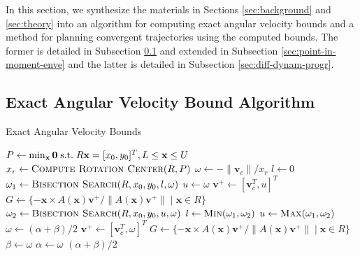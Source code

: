 \documentclass[conference]{IEEEtran}
\makeatletter
\def\BState{\State\hskip-\ALG@thistlm}
\makeatother
\begin{document}
In this section, we synthesize the materials in Sections
\ref{sec:background} and \ref{sec:theory} into an algorithm for
computing exact angular velocity bounds and a method for planning
convergent trajectories using the computed bounds. The former is
detailed in Subsection \ref{sec:exact-ang-vel-bound-alg} and extended
in Subsection \ref{sec:point-in-moment-enve} and the latter is
detailed in Subsection \ref{sec:diff-dynam-progr}.



\subsection{Exact Angular Velocity Bound
  Algorithm}\label{sec:exact-ang-vel-bound-alg}

\begin{algorithm}[t]
\caption{Exact Angular Velocity Bounds}\label{alg:angular-velocity-bounds}
\begin{algorithmic}[1]
 \Return {$[0,0]$}
\EndIf
\State $P \gets \min_\mathbf{x} \mathbf{0} \text{\;s.t.\;} R\mathbf{x} = [x_0,y_0]^T,  L \leq \mathbf{x} \leq U$ \label{line:find-pressure}
\State $x_r \gets \Call{Compute Rotation Center}{R,P}$ \label{line:find-rc}
\State $\omega \gets -\lVert\mathbf{v}_c\rVert/x_r$ \label{line:rc-to-w}
\State $l \gets 0$ \label{line:0}
\State $\omega_1 \gets \Call{Bisection Search}{R,x_0,y_0,l,\omega}$ \label{line:bisection-1}
\State $u \gets \omega$ \label{line:find-u-start}
\Do%
\State $\mathbf{v}^+ \gets [\mathbf{v}_c^T, u]^T$
\State $G \gets \{-\mathbf{x}\times A(\mathbf{x})\mathbf{v}^+ / \lVert A(\mathbf{x})\mathbf{v}^+ \rVert \;|\; \mathbf{x} \in R\}$
 \label{line:find-u-end}
\State $\omega_2 \gets \Call{Bisection Search}{R,x_0,y_0,u,\omega}$ \label{line:bisection-2}
\State $l \gets \Call{Min}{\omega_1,\omega_2}$
\State $u \gets \Call{Max}{\omega_1,\omega_2}$
\State \Return {$[l, u]$}
\EndFunction
% 
\While{$\varepsilon < |\alpha-\beta|$}
\State $\omega \gets (\alpha + \beta)/2$
\State $\mathbf{v}^+ \gets [\mathbf{v}_c^T, \omega]^T$
\State $G \gets \{-\mathbf{x}\times A(\mathbf{x})\mathbf{v}^+ / \lVert A(\mathbf{x})\mathbf{v}^+ \rVert \;|\; \mathbf{x} \in R\}$
\State $\beta \gets \omega$
\Else{} 
\State $\alpha \gets \omega$
\EndIf
\EndWhile
\State \Return $(\alpha + \beta)/2$
\EndFunction
\end{algorithmic}
\end{algorithm}
\end{document}
